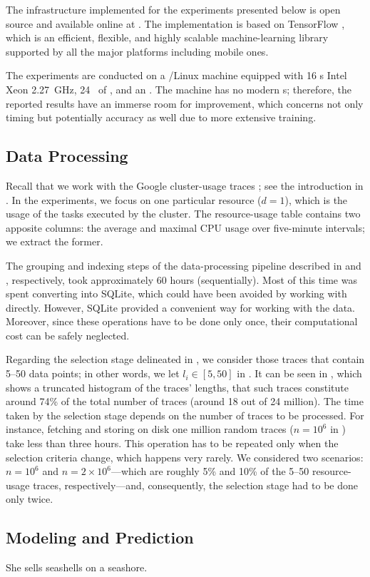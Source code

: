 The infrastructure implemented for the experiments presented below is open
source and available online at \cite{sources}. The implementation is based on
TensorFlow \cite{abadi2015}, which is an efficient, flexible, and highly
scalable machine-learning library supported by all the major platforms including
mobile ones.

The experiments are conducted on a /Linux machine equipped with 16
s Intel Xeon  2.27~GHz, 24~ of , and an
. The machine has no modern s; therefore, the reported results
have an immerse room for improvement, which concerns not only timing but
potentially accuracy as well due to more extensive training.

\subsection{Data Processing}
Recall that we work with the Google cluster-usage traces \cite{reiss2011}; see
the introduction in . In the experiments, we focus on one particular
resource ($d = 1$), which is the  usage of the tasks executed by the
cluster. The resource-usage table contains two apposite columns: the average and
maximal CPU usage over five-minute intervals; we extract the former.

The grouping and indexing steps of the data-processing pipeline described in
 and , respectively, took approximately 60 hours
(sequentially). Most of this time was spent converting  into SQLite,
which could have been avoided by working with  directly. However, SQLite
provided a convenient way for working with the data. Moreover, since these
operations have to be done only once, their computational cost can be safely
neglected.


Regarding the selection stage delineated in , we consider those
traces that contain 5--50 data points; in other words, we let $l_i \in [5, 50]$
in . It can be seen in , which shows a truncated
histogram of the traces' lengths, that such traces constitute around 74\% of the
total number of traces (around 18 out of 24 million). The time taken by the
selection stage depends on the number of traces to be processed. For instance,
fetching and storing on disk one million random traces ($n = 10^6$ in
) take less than three hours. This operation has to be repeated
only when the selection criteria change, which happens very rarely. We
considered two scenarios: $n = 10^6$ and $n = 2 \times 10^6$---which are roughly
5\% and 10\% of the 5--50 resource-usage traces, respectively---and,
consequently, the selection stage had to be done only twice.

\subsection{Modeling and Prediction}
She sells seashells on a seashore.
